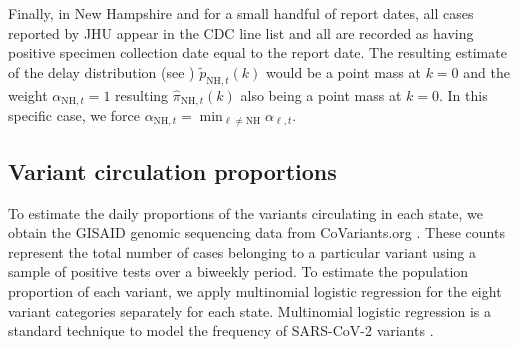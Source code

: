 
Finally, in New Hampshire and for a small handful of report dates, all cases
reported by JHU appear in the CDC line list and all are recorded as having
positive specimen collection date equal to the report date. The resulting
estimate of the delay distribution (see )
$\widetilde{p}_{\textrm{NH},t}(k)$ would be a point mass at $k=0$ and the weight
$\alpha_{\textrm{NH},t}=1$ resulting $\widehat\pi_{\textrm{NH},t}(k)$ also being a
point mass at $k=0$. In this specific case, we force $\alpha_{\textrm{NH},t} =
\min_{\ell\neq\textrm{NH}} \alpha_{\ell,t}$.

\subsection{Variant circulation proportions}
\label{sec:variant-proportions}


To estimate the daily proportions of the variants circulating in each state, we
obtain the GISAID genomic sequencing data from CoVariants.org
\citep{hodcroft2021covariants, elbe2017data}. These counts represent the total
number of cases belonging to a particular variant using
a sample of positive tests over a biweekly period. To estimate the population
proportion of each variant, we apply multinomial logistic regression 
for the eight variant categories separately for each state. 
Multinomial logistic regression is a standard technique to model the
frequency of SARS-CoV-2 variants 
\citep{obermeyer2022analysis, annavajhala2021emergence, figgins2021sars}.

